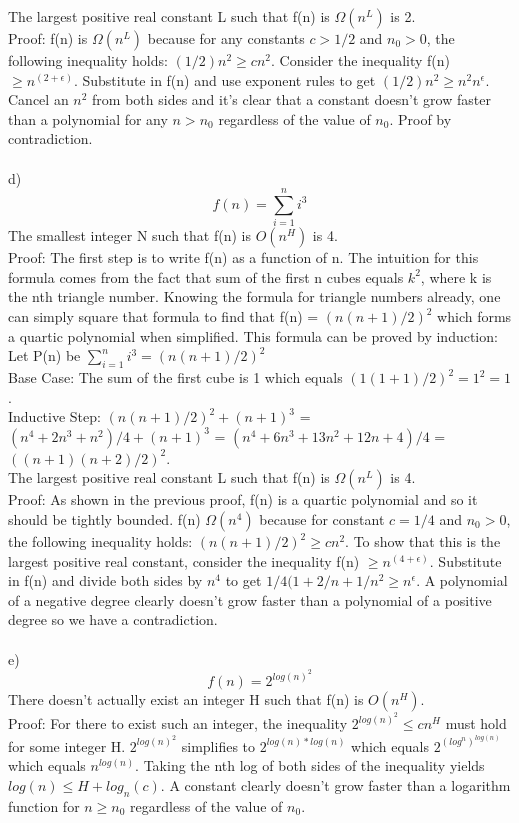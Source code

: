 \documentclass{article}
\begin{document}
The largest positive real constant L such that f(n) is $\Omega(n^L)$ is 2.\\ Proof: f(n) is $\Omega(n^L)$ because for any constants $c > 1/2$ and $n_0 > 0$, the following inequality holds: $(1/2)n^2 \geq cn^2$. Consider the inequality f(n) $\geq n^{(2 + \epsilon)}$. Substitute in f(n) and use exponent rules to get $(1/2)n^2 \geq n^2n^{\epsilon}$. Cancel an $n^2$ from both sides and it's clear that a constant doesn't grow faster than a polynomial for any $n > n_0$ regardless of the value of $n_0$. Proof by contradiction.\\\\

d) \[f(n) = \sum_{i=1}^{n} i^3\] The smallest integer N such that f(n) is $O(n^H)$ is 4.\\ Proof: The first step is to write f(n) as a function of n. The intuition for this formula comes from the fact that sum of the first n cubes equals $k^2$, where k is the nth triangle number. Knowing the formula for triangle numbers already, one can simply square that formula to find that f(n) = $(n(n + 1)/2)^2$ which forms a quartic polynomial when simplified. This formula can be proved by induction:\\
Let P(n) be $\sum_{i=1}^{n} i^3 = (n(n + 1)/2)^2$\\
Base Case: The sum of the first cube is 1 which equals $(1(1+1)/2)^2 = 1^2 = 1$.\\
Inductive Step: $(n(n + 1)/2)^2 + (n + 1)^3$ = $(n^4+2n^3+n^2)/4 + (n + 1)^3$ = $(n^4+6n^3+13n^2+12n+4)/4$ = $((n+1)(n+2)/2)^2$.\\

The largest positive real constant L such that f(n) is $\Omega(n^L)$ is 4.\\ Proof: As shown in the previous proof, f(n) is a quartic polynomial and so it should be tightly bounded. f(n) $\Omega(n^4)$ because for constant $c = 1/4$ and $n_0 > 0$, the following inequality holds: $(n(n + 1)/2)^2 \geq cn^2$. To show that this is the largest positive real constant, consider the inequality f(n) $\geq n^{(4 + \epsilon)}$. Substitute in f(n) and divide both sides by $n^4$ to get $1/4(1 + 2/n + 1/n^2 \geq n^{\epsilon}$. A polynomial of a negative degree clearly doesn't grow faster than a polynomial of a positive degree so we have a contradiction.\\\\

e) \[f(n) = 2^{log(n)^2}\] There doesn't actually exist an integer H such that f(n) is $O(n^H)$.\\ Proof: For there to exist such an integer, the inequality $2^{log(n)^2} \leq cn^H$ must hold for some integer H. $2^{log(n)^2}$ simplifies to $2^{log(n)*log(n)}$ which equals $2^{(log^n)^{log(n)}}$ which equals $n^{log(n)}$. Taking the nth log of both sides of the inequality yields $log(n) \leq H + log_n(c)$. A constant clearly doesn't grow faster than a logarithm function for $n \geq n_0$ regardless of the value of $n_0$.\\
\end{document}
